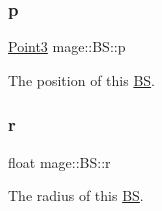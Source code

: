 \subsubsection{\texorpdfstring{p}{p}}
{\footnotesize\ttfamily \hyperlink{structmage_1_1_point3}{Point3} mage\+::\+B\+S\+::p}

The position of this \hyperlink{structmage_1_1_b_s}{BS}. \hypertarget{structmage_1_1_b_s_ab2e786e8493feb28a3bc0216e8dea5bc}{}\label{structmage_1_1_b_s_ab2e786e8493feb28a3bc0216e8dea5bc} 
\subsubsection{\texorpdfstring{r}{r}}
{\footnotesize\ttfamily float mage\+::\+B\+S\+::r}

The radius of this \hyperlink{structmage_1_1_b_s}{BS}. 